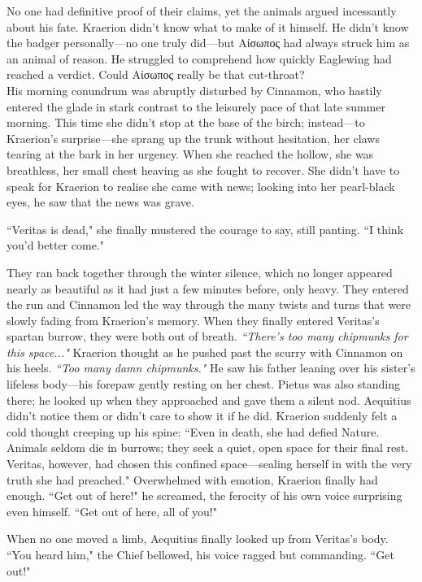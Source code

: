 No one had definitive proof of their claims, yet the animals argued incessantly about his fate.
Kraerion didn't know what to make of it himself.
He didn't know the badger personally---no one truly did---but Αίσωπος had always struck him as an animal of reason.
He struggled to comprehend how quickly Eaglewing had reached a verdict. %
Could Αίσωπος really be that cut-throat?\\

His morning conundrum was abruptly disturbed by Cinnamon, who hastily entered the glade in stark contrast to the leisurely pace of that late summer morning.
This time she didn't stop at the base of the birch; instead---to Kraerion's surprise---she sprang up the trunk without hesitation, her claws tearing at the bark in her urgency.
When she reached the hollow, she was breathless, her small chest heaving as she fought to recover.
She didn't have to speak for Kraerion to realise she came with news; looking into her pearl-black eyes, he saw that the news was grave.

``Veritas is dead," she finally mustered the courage to say, still panting.
``I think you'd better come."

They ran back together through the winter silence, which no longer appeared nearly as beautiful as it had just a few minutes before, only heavy.
They entered the run and Cinnamon led the way through the many twists and turns that were slowly fading from Kraerion's memory.
When they finally entered Veritas's spartan burrow, they were both out of breath.
\textit{``There's too many chipmunks for this space..."} Kraerion thought as he pushed past the scurry with Cinnamon on his heels.
\textit{``Too many damn chipmunks."}
He saw his father leaning over his sister's lifeless body---his forepaw gently resting on her chest.
Pietus was also standing there; he looked up when they approached and gave them a silent nod.
Aequitius didn't notice them or didn't care to show it if he did.
Kraerion suddenly felt a cold thought creeping up his spine: ``Even in death, she had defied Nature.
Animals seldom die in burrows; they seek a quiet, open space for their final rest.
Veritas, however, had chosen this confined space---sealing herself in with the very truth she had preached."
Overwhelmed with emotion, Kraerion finally had enough.
``Get out of here!" he screamed, the ferocity of his own voice surprising even himself.
``Get out of here, all of you!"

When no one moved a limb, Aequitius finally looked up from Veritas's body.
``You heard him," the Chief bellowed, his voice ragged but commanding.
``Get out!"


